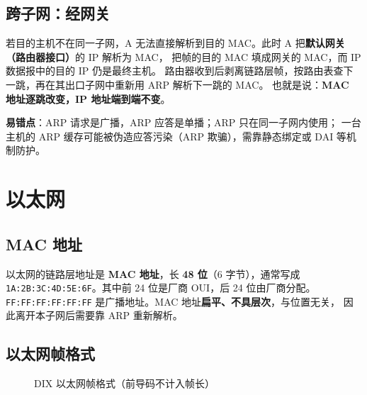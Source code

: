\subsection{跨子网：经网关}

若目的主机不在同一子网，A 无法直接解析到目的 MAC。此时 A 把\textbf{默认网关（路由器接口）}的 IP 解析为 MAC，
把帧的目的 MAC 填成网关的 MAC，而 IP 数据报中的目的 IP 仍是最终主机。
路由器收到后剥离链路层帧，按路由表查下一跳，再在其出口子网中重新用 ARP 解析下一跳的 MAC。
也就是说：\textbf{MAC 地址逐跳改变，IP 地址端到端不变}。

\noindent\textbf{易错点}：ARP 请求是广播，ARP 应答是单播；ARP 只在同一子网内使用；
一台主机的 ARP 缓存可能被伪造应答污染（ARP 欺骗），需靠静态绑定或 DAI 等机制防护。

\section{以太网}

\subsection{MAC 地址}

以太网的链路层地址是 \textbf{MAC 地址}，长 \textbf{48 位}（6 字节），通常写成
\texttt{1A:2B:3C:4D:5E:6F}。其中前 24 位是厂商 OUI，后 24 位由厂商分配。
\texttt{FF:FF:FF:FF:FF:FF} 是广播地址。MAC 地址\textbf{扁平、不具层次}，与位置无关，
因此离开本子网后需要靠 ARP 重新解析。

\subsection{以太网帧格式}

\begin{figure}[H]
\centering
{}
\caption{DIX 以太网帧格式（前导码不计入帧长）}
\label{fig:eth_frame}
\end{figure}

